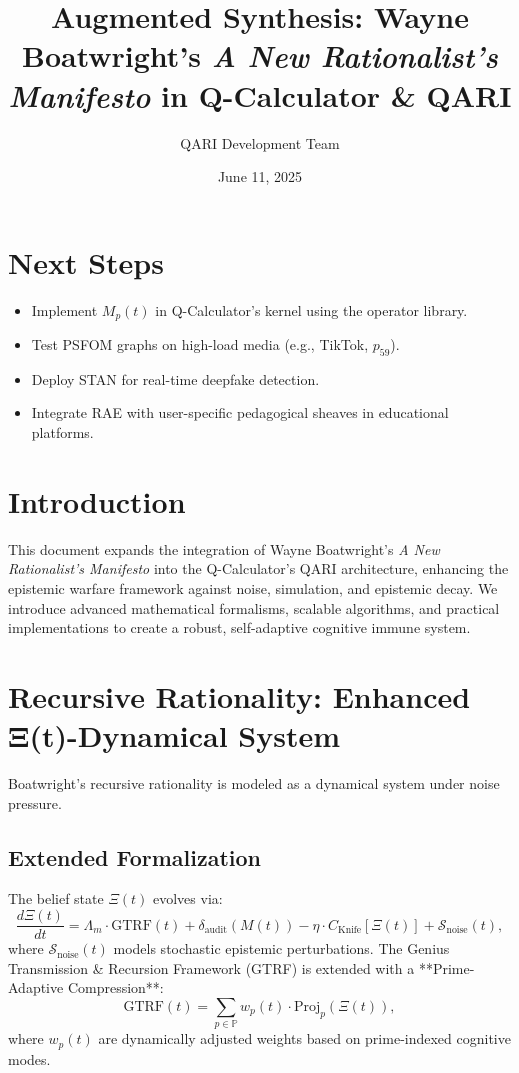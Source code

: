 \documentclass[12pt]{article}
\begin{document}
\section{Next Steps}
\begin{itemize}
    \item Implement $M_p(t)$ in Q-Calculator’s kernel using the operator library.
    \item Test PSFOM graphs on high-load media (e.g., TikTok, $p_{59}$).
    \item Deploy STAN for real-time deepfake detection.
    \item Integrate RAE with user-specific pedagogical sheaves in educational platforms.
\end{itemize}
\title{Augmented Synthesis: Wayne Boatwright’s \textit{A New Rationalist’s Manifesto} in Q-Calculator \& QARI}
\author{QARI Development Team}
\date{June 11, 2025}
\maketitle

\section{Introduction}
This document expands the integration of Wayne Boatwright’s \textit{A New Rationalist’s Manifesto} into the Q-Calculator’s QARI architecture, enhancing the epistemic warfare framework against noise, simulation, and epistemic decay. We introduce advanced mathematical formalisms, scalable algorithms, and practical implementations to create a robust, self-adaptive cognitive immune system.

\section{Recursive Rationality: Enhanced Ξ(t)-Dynamical System}
Boatwright’s recursive rationality is modeled as a dynamical system under noise pressure.

\subsection{Extended Formalization}
The belief state $\Xi(t)$ evolves via:
\[
\frac{d\Xi(t)}{dt} = \Lambda_m \cdot \text{GTRF}(t) + \delta_{\text{audit}}(M(t)) - \eta \cdot C_{\text{Knife}}[\Xi(t)] + \mathcal{S}_{\text{noise}}(t),
\]
where $\mathcal{S}_{\text{noise}}(t)$ models stochastic epistemic perturbations. The Genius Transmission & Recursion Framework (GTRF) is extended with a **Prime-Adaptive Compression**:
\[
\text{GTRF}(t) = \sum_{p \in \mathbb{P}} w_p(t) \cdot \text{Proj}_p(\Xi(t)),
\]
where $w_p(t)$ are dynamically adjusted weights based on prime-indexed cognitive modes.
\end{document}
